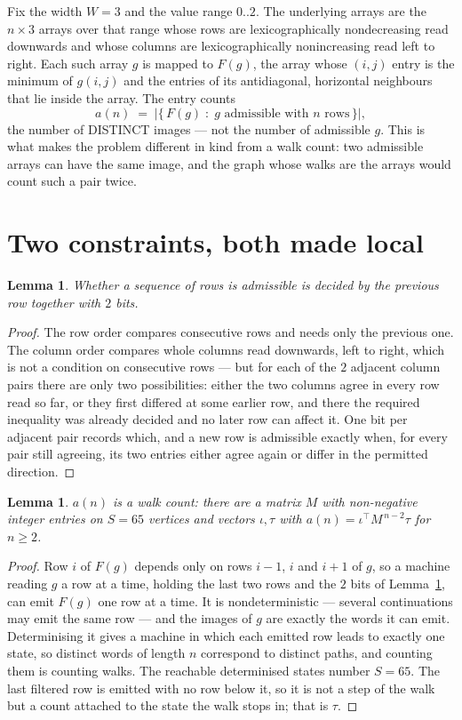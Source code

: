 \documentclass[11pt,a4paper]{article}
\theoremstyle{plain}
\newtheorem{lemma}[theorem]{Lemma}
\theoremstyle{definition}
\begin{document}
Fix the width $W=3$ and the value range $0..2$. The underlying arrays are the
$n\times3$ arrays over that range whose rows are lexicographically nondecreasing read downwards
and whose columns are lexicographically nonincreasing read left to right. Each such array $g$
is mapped to $F(g)$, the array whose $(i,j)$ entry is the minimum of $g(i,j)$ and the entries
of its antidiagonal, horizontal neighbours that lie inside the array. The entry counts
\[
a(n)\;=\;\bigl|\{\,F(g)\;:\;g\text{ admissible with }n\text{ rows}\,\}\bigr|,
\]
the number of DISTINCT images --- not the number of admissible $g$. This is what makes the
problem different in kind from a walk count: two admissible arrays can have the same image, and
the graph whose walks are the arrays would count such a pair twice.

\section{Two constraints, both made local}

\begin{lemma}\label{lem:local}
Whether a sequence of rows is admissible is decided by the previous row together with
$2$ bits.
\end{lemma}

\begin{proof}
The row order compares consecutive rows and needs only the previous one. The column order
compares whole columns read downwards, left to right, which is not a condition on consecutive
rows --- but for each of the $2$ adjacent column pairs there are only two possibilities:
either the two columns agree in every row read so far, or they first differed at some earlier
row, and there the required inequality was already decided and no later row can affect it. One
bit per adjacent pair records which, and a new row is admissible exactly when, for every pair
still agreeing, its two entries either agree again or differ in the permitted direction.
\end{proof}

\begin{lemma}\label{lem:det}
$a(n)$ is a walk count: there are a matrix $M$ with non-negative integer entries on $S=65$
vertices and vectors $\iota,\tau$ with $a(n)=\iota^{\!\top}M^{\,n-2}\tau$ for $n\ge2$.
\end{lemma}

\begin{proof}
Row $i$ of $F(g)$ depends only on rows $i-1$, $i$ and $i+1$ of $g$, so a machine reading $g$ a
row at a time, holding the last two rows and the $2$ bits of Lemma~\ref{lem:local}, can
emit $F(g)$ one row at a time. It is nondeterministic --- several continuations may emit the
same row --- and the images of $g$ are exactly the words it can emit. Determinising it gives a
machine in which each emitted row leads to exactly one state, so distinct words of length $n$
correspond to distinct paths, and counting them is counting walks. The reachable determinised
states number $S=65$. The last filtered row is emitted with no row below it, so it is not a
step of the walk but a count attached to the state the walk stops in; that is $\tau$.
\end{proof}
\end{document}
